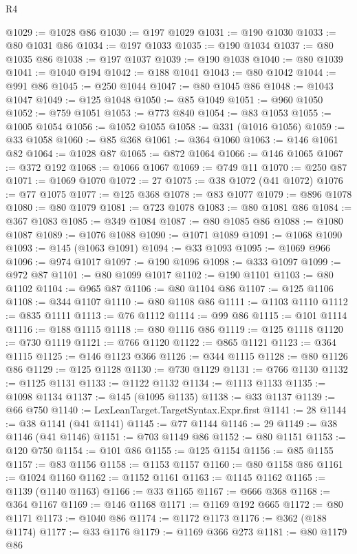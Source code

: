 \begin{lexlean}{R4}
\begin{coremodule}
@1029 := @1028 @86
@1030 := @197 @1029
@1031 := @190 @1030
@1033 := @80 @1031 @86
@1034 := @197 @1033
@1035 := @190 @1034
@1037 := @80 @1035 @86
@1038 := @197 @1037
@1039 := @190 @1038
@1040 := @80 @1039
@1041 := @1040 @194
@1042 := @188 @1041
@1043 := @80 @1042
@1044 := @991 @86
@1045 := @250 @1044
@1047 := @80 @1045 @86
@1048 := @1043 @1047
@1049 := @125 @1048
@1050 := @85 @1049
@1051 := @960 @1050
@1052 := @759 @1051
@1053 := @773 @840
@1054 := @83 @1053
@1055 := @1005 @1054
@1056 := @1052 @1055
@1058 := @331 (@1016 @1056)
@1059 := @33 @1058
@1060 := @85 @368
@1061 := @364 @1060
@1063 := @146 @1061 @82
@1064 := @1028 @87
@1065 := @872 @1064
@1066 := @146 @1065
@1067 := @372 @192
@1068 := @1066 @1067
@1069 := @749 @11
@1070 := @250 @87
@1071 := @1069 @1070
@1072 := 27
@1075 := @38 @1072 (@41 @1072)
@1076 := @77 @1075
@1077 := @125 @368
@1078 := @83 @1077
@1079 := @896 @1078
@1080 := @80 @1079
@1081 := @723 @1078
@1083 := @80 @1081 @86
@1084 := @367 @1083
@1085 := @349 @1084
@1087 := @80 @1085 @86
@1088 := @1080 @1087
@1089 := @1076 @1088
@1090 := @1071 @1089
@1091 := @1068 @1090
@1093 := @145 (@1063 @1091)
@1094 := @33 @1093
@1095 := @1069 @966
@1096 := @974 @1017
@1097 := @190 @1096
@1098 := @333 @1097
@1099 := @972 @87
@1101 := @80 @1099 @1017
@1102 := @190 @1101
@1103 := @80 @1102
@1104 := @965 @87
@1106 := @80 @1104 @86
@1107 := @125 @1106
@1108 := @344 @1107
@1110 := @80 @1108 @86
@1111 := @1103 @1110
@1112 := @835 @1111
@1113 := @76 @1112
@1114 := @99 @86
@1115 := @101 @1114
@1116 := @188 @1115
@1118 := @80 @1116 @86
@1119 := @125 @1118
@1120 := @730 @1119
@1121 := @766 @1120
@1122 := @865 @1121
@1123 := @364 @1115
@1125 := @146 @1123 @366
@1126 := @344 @1115
@1128 := @80 @1126 @86
@1129 := @125 @1128
@1130 := @730 @1129
@1131 := @766 @1130
@1132 := @1125 @1131
@1133 := @1122 @1132
@1134 := @1113 @1133
@1135 := @1098 @1134
@1137 := @145 (@1095 @1135)
@1138 := @33 @1137
@1139 := @66 @750
@1140 := LexLeanTarget.TargetSyntax.Expr.first
@1141 := 28
@1144 := @38 @1141 (@41 @1141)
@1145 := @77 @1144
@1146 := 29
@1149 := @38 @1146 (@41 @1146)
@1151 := @703 @1149 @86
@1152 := @80 @1151
@1153 := @120 @750
@1154 := @101 @86
@1155 := @125 @1154
@1156 := @85 @1155
@1157 := @83 @1156
@1158 := @1153 @1157
@1160 := @80 @1158 @86
@1161 := @1024 @1160
@1162 := @1152 @1161
@1163 := @1145 @1162
@1165 := @1139 (@1140 @1163)
@1166 := @33 @1165
@1167 := @666 @368
@1168 := @364 @1167
@1169 := @146 @1168
@1171 := @1169 @192 @665
@1172 := @80 @1171
@1173 := @1040 @86
@1174 := @1172 @1173
@1176 := @362 (@188 @1174)
@1177 := @33 @1176
@1179 := @1169 @366 @273
@1181 := @80 @1179 @86

\end{coremodule}
\end{lexlean}
